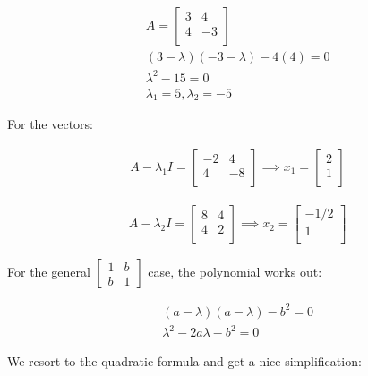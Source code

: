 \documentclass[
]{article}
\begin{document}
\[
  \begin{aligned}
    & A = \begin{bmatrix}
      3 & 4\\
      4 & -3\\
    \end{bmatrix}\\
    & (3 - \lambda)(-3 - \lambda) -4(4) = 0\\
    & \lambda^2 - 15 = 0\\
    & \lambda_1 = 5, \lambda_2 = -5
  \end{aligned}
\]

For the vectors:

\[
  \begin{aligned}
    & A - \lambda_1I = \begin{bmatrix}
      -2 & 4\\
      4 & -8\\
    \end{bmatrix} \implies x_1 = \begin{bmatrix}
      2\\
      1\\
    \end{bmatrix}
  \end{aligned}
\]

\[
  \begin{aligned}
    & A - \lambda_2I = \begin{bmatrix}
      8 & 4\\
      4 & 2\\
    \end{bmatrix} \implies x_2 = \begin{bmatrix}
      -1/2\\
      1\\
    \end{bmatrix}
  \end{aligned}
\]

For the general \(\begin{bmatrix}1 & b\\ b & 1\end{bmatrix}\) case, the
polynomial works out:

\[
  \begin{aligned}
    & (a-\lambda)(a-\lambda) - b^2 = 0\\
    & \lambda^2 -2a \lambda - b^2 = 0
  \end{aligned}
\]

We resort to the quadratic formula and get a nice simplification:
\end{document}
